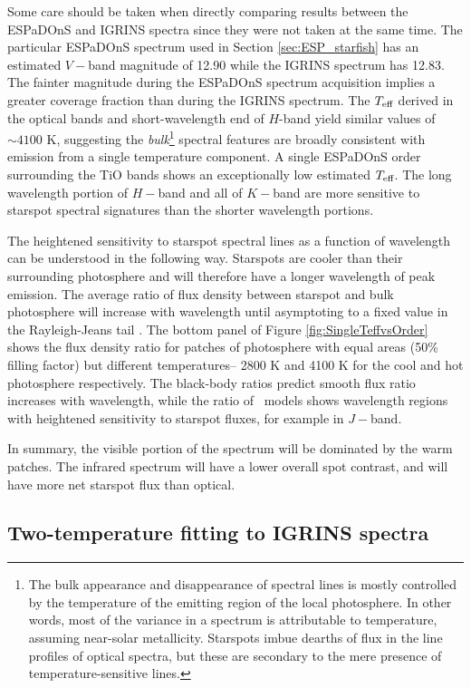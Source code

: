 \documentclass[twocolumn]{emulateapj}%
\begin{document}
Some care should be taken when directly comparing results between the ESPaDOnS and IGRINS spectra since they were not taken at the same time.  The particular ESPaDOnS spectrum used in Section \ref{sec:ESP_starfish} has an estimated $V-$band magnitude of 12.90 while the IGRINS spectrum has 12.83.  The fainter magnitude during the ESPaDOnS spectrum acquisition implies a greater coverage fraction than during the IGRINS spectrum.  The $T_\textrm{eff}$ derived in the optical bands and short-wavelength end of $H$-band yield similar values of $\sim 4100$ K, suggesting the \emph{bulk}\footnote{The bulk appearance and disappearance of spectral lines is mostly controlled by the temperature of the emitting region of the local photosphere.  In other words, most of the variance in a spectrum is attributable to temperature, assuming near-solar metallicity.  Starspots imbue dearths of flux in the line profiles of optical spectra, but these are secondary to the mere presence of temperature-sensitive lines.} spectral features are broadly consistent with emission from a single temperature component. A single ESPaDOnS order surrounding the TiO bands shows an exceptionally low estimated $T_\textrm{eff}$.  The long wavelength portion of $H-$band and all of $K-$band are more sensitive to starspot spectral signatures than the shorter wavelength portions.

The heightened sensitivity to starspot spectral lines as a function of wavelength can be understood in the following way.  Starspots are cooler than their surrounding photosphere and will therefore have a longer wavelength of peak emission.  The average ratio of flux density between starspot and bulk photosphere will increase with wavelength until asymptoting to a fixed value in the Rayleigh-Jeans tail \citep{wolk96}.  The bottom panel of Figure \ref{fig:SingleTeffvsOrder} shows the flux density ratio for patches of photosphere with equal areas (50\% filling factor) but different temperatures-- 2800 K and 4100 K for the cool and hot photosphere respectively.  The black-body ratios predict smooth flux ratio increases with wavelength, while the ratio of \PHOENIX\ models shows wavelength regions with heightened sensitivity to starspot fluxes, for example in $J-$band.

In summary, the visible portion of the spectrum will be dominated by the warm patches.  The infrared spectrum will have a lower overall spot contrast, and will have more net starspot flux than optical.

\subsection{Two-temperature fitting to IGRINS spectra}\label{sec:two_tempIGRINS}
\end{document}
